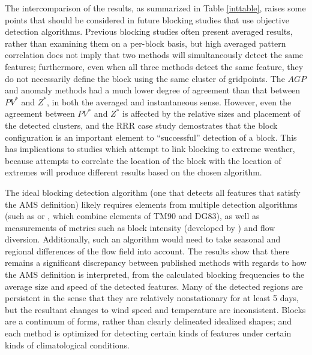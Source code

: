 \documentclass[smallextended]{svjour3}       %
\numberwithin{equation}{section}
\begin{document}
The intercomparison of the results, as summarized in Table \ref{inttable}, raises some points that should be considered in future blocking studies that use objective detection algorithms.   Previous blocking studies often present averaged results, rather than examining them on a per-block basis, but high averaged pattern correlation does not imply that two methods will simultaneously detect the same features; furthermore, even when all three methods detect the same feature, they do not necessarily define the block using the same cluster of gridpoints. The $AGP$ and anomaly methods had a much lower degree of agreement than that between $PV^*$ and $Z^*$, in both the averaged and instantaneous sense. However, even the agreement between $PV^*$ and $Z^*$ is affected by the relative sizes and placement of the detected clusters, and the RRR case study demostrates that the block configuration is an important element to ``successful'' detection of a block. This has implications to studies which attempt to link blocking to extreme weather, because attempts to correlate the location of the block with the location of extremes will produce different results based on the chosen algorithm. 

The ideal blocking detection algorithm (one that detects all features that satisfy the AMS definition) likely requires elements from multiple detection algorithms (such as \cite{dunn-sigouin_evaluation_2012} or \cite{barriopedro_application_2010}, which combine elements of TM90 and DG83), as well as measurements of metrics such as block intensity (developed by \citealt{wiedenmann_climatology_2002}) and flow diversion. Additionally, such an algorithm would need to take seasonal and regional differences of the flow field into account.   The results show that there remains a significant discrepancy between published methods with regards to how the AMS definition is interpreted, from the calculated blocking frequencies to the average size and speed of the detected features. Many of the detected regions are persistent in the sense that they are relatively nonstationary for at least 5 days, but the resultant changes to wind speed and temperature are inconsistent. Blocks are a continuum of forms, rather than clearly delineated idealized shapes; and each method is optimized for detecting certain kinds of features under certain kinds of climatological conditions. 
\end{document}
